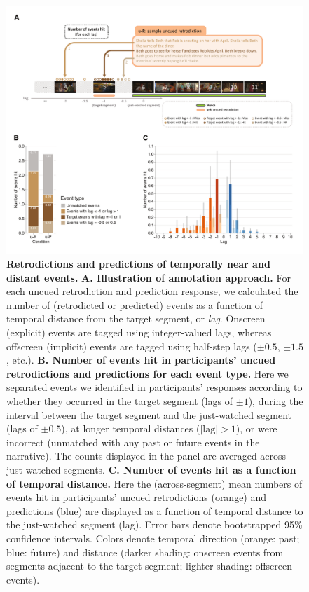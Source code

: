 \documentclass[10pt]{article}
\begin{document}
\begin{figure}[tp]
  \centering
  \includegraphics[width=\textwidth]{results2}
  \caption{\textbf{Retrodictions and predictions of temporally near and distant events.}  \textbf{A. Illustration of annotation approach.}  For each uncued retrodiction and prediction response, we calculated the number of (retrodicted or predicted) events as a function of temporal distance from the target segment, or \textit{lag}.  Onscreen (explicit) events are tagged using integer-valued lags, whereas offscreen (implicit) events are tagged using half-step lags ($\pm 0.5$, $\pm 1.5$, etc.).  \textbf{B. Number of events hit in participants' uncued retrodictions and predictions for each event type.}  Here we separated events we identified in participants' responses according to whether they occurred in the target segment (lags of $\pm 1$), during the interval between the target segment and the just-watched segment (lags of $\pm 0.5$), at longer temporal distances ($|\mathrm{lag}| > 1$), or were incorrect (unmatched with any past or future events in the narrative).  The counts displayed in the panel are averaged across just-watched segments.  \textbf{C. Number of events hit as a function of temporal distance.}  Here the (across-segment) mean numbers of events hit in participants' uncued retrodictions (orange) and predictions (blue) are displayed as a function of temporal distance to the just-watched segment (lag).  Error bars denote bootstrapped 95\% confidence intervals.  Colors denote temporal direction (orange: past; blue: future) and distance (darker shading: onscreen events from segments adjacent to the target segment; lighter shading: offscreen events).}
  \label{fig:result2}
\end{figure}
\end{document}
